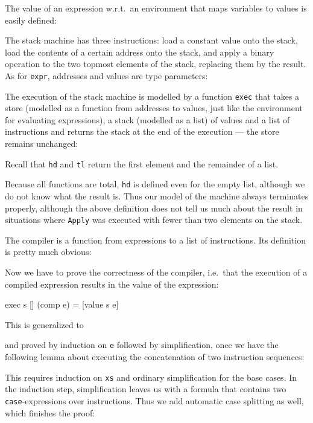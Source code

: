 The value of an expression w.r.t.\ an environment that maps variables to
values is easily defined:
\begin{ttbox}
\end{ttbox}

The stack machine has three instructions: load a constant value onto the
stack, load the contents of a certain address onto the stack, and apply a
binary operation to the two topmost elements of the stack, replacing them by
the result. As for \texttt{expr}, addresses and values are type parameters:
\begin{ttbox}
\end{ttbox}

The execution of the stack machine is modelled by a function \texttt{exec}
that takes a store (modelled as a function from addresses to values, just
like the environment for evaluating expressions), a stack (modelled as a
list) of values and a list of instructions and returns the stack at the end
of the execution --- the store remains unchanged:
\begin{ttbox}
\end{ttbox}
Recall that \texttt{hd} and \texttt{tl}
return the first element and the remainder of a list.

Because all functions are total, \texttt{hd} is defined even for the empty
list, although we do not know what the result is. Thus our model of the
machine always terminates properly, although the above definition does not
tell us much about the result in situations where \texttt{Apply} was executed
with fewer than two elements on the stack.

The compiler is a function from expressions to a list of instructions. Its
definition is pretty much obvious:
\begin{ttbox}\makeatother
\end{ttbox}

Now we have to prove the correctness of the compiler, i.e.\ that the
execution of a compiled expression results in the value of the expression:
\begin{ttbox}
exec s [] (comp e) = [value s e]
\end{ttbox}
This is generalized to
\begin{ttbox}
\end{ttbox}
and proved by induction on \texttt{e} followed by simplification, once we
have the following lemma about executing the concatenation of two instruction
sequences:
\begin{ttbox}\makeatother
\end{ttbox}
This requires induction on \texttt{xs} and ordinary simplification for the
base cases. In the induction step, simplification leaves us with a formula
that contains two \texttt{case}-expressions over instructions. Thus we add
automatic case splitting as well, which finishes the proof:
\begin{ttbox}
\end{ttbox}


